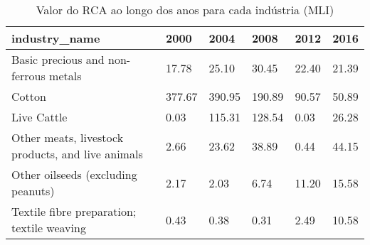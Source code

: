 \begin{table}
\centering
\caption{Valor do RCA ao longo dos anos para cada indústria (MLI)}
\begin{tabular}{p{6cm}p{1.5cm}p{1.5cm}p{1.5cm}p{1.5cm}p{1.5cm}}
\toprule
                                    industry\_name &   2000 &   2004 &   2008 &  2012 &  2016 \\
\midrule
            Basic precious and non-ferrous metals &  17.78 &  25.10 &  30.45 & 22.40 & 21.39 \\
                                           Cotton & 377.67 & 390.95 & 190.89 & 90.57 & 50.89 \\
                                      Live Cattle &   0.03 & 115.31 & 128.54 &  0.03 & 26.28 \\
Other meats, livestock products, and live animals &   2.66 &  23.62 &  38.89 &  0.44 & 44.15 \\
               Other oilseeds (excluding peanuts) &   2.17 &   2.03 &   6.74 & 11.20 & 15.58 \\
       Textile fibre preparation; textile weaving &   0.43 &   0.38 &   0.31 &  2.49 & 10.58 \\
\bottomrule
\end{tabular}
\end{table}
